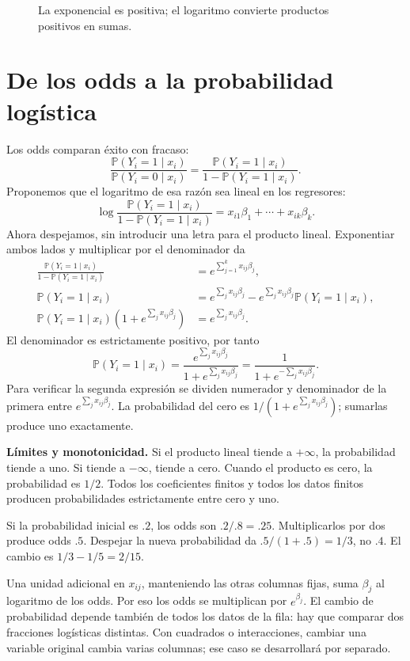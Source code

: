 \documentclass[11pt,a4paper]{article}
\newcommand{\Prob}{\mathbb P}
\begin{document}
\begin{figure}[H]\centering
{}
\caption{La exponencial es positiva; el logaritmo convierte productos positivos en sumas.}
\end{figure}

\clearpage
\section{De los odds a la probabilidad logística}\label{logit4}
Los odds comparan éxito con fracaso:
\[
\frac{\Prob(Y_i=1\mid x_i)}{\Prob(Y_i=0\mid x_i)}
=\frac{\Prob(Y_i=1\mid x_i)}{1-\Prob(Y_i=1\mid x_i)}.
\]
Proponemos que el logaritmo de esa razón sea lineal en los regresores:
\[
\log\frac{\Prob(Y_i=1\mid x_i)}{1-\Prob(Y_i=1\mid x_i)}
=x_{i1}\beta_1+\cdots+x_{ik}\beta_k.
\]
Ahora despejamos, sin introducir una letra para el producto lineal.
Exponentiar ambos lados y multiplicar por el denominador da
\[
\begin{aligned}
\frac{\Prob(Y_i=1\mid x_i)}{1-\Prob(Y_i=1\mid x_i)}
&=e^{\sum_{j=1}^kx_{ij}\beta_j},\\
\Prob(Y_i=1\mid x_i)
&=e^{\sum_jx_{ij}\beta_j}
-e^{\sum_jx_{ij}\beta_j}\Prob(Y_i=1\mid x_i),\\
\Prob(Y_i=1\mid x_i)(1+e^{\sum_jx_{ij}\beta_j})
&=e^{\sum_jx_{ij}\beta_j}.
\end{aligned}
\]
El denominador es estrictamente positivo, por tanto
\[
\boxed{\Prob(Y_i=1\mid x_i)=
\frac{e^{\sum_jx_{ij}\beta_j}}{1+e^{\sum_jx_{ij}\beta_j}}
=\frac1{1+e^{-\sum_jx_{ij}\beta_j}}}.
\]
Para verificar la segunda expresión se dividen numerador y denominador
de la primera entre $e^{\sum_jx_{ij}\beta_j}$.
La probabilidad del cero es $1/(1+e^{\sum_jx_{ij}\beta_j})$;
sumarlas produce uno exactamente.

\textbf{Límites y monotonicidad.}
Si el producto lineal tiende a $+\infty$, la probabilidad tiende a uno.
Si tiende a $-\infty$, tiende a cero.
Cuando el producto es cero, la probabilidad es $1/2$.
Todos los coeficientes finitos y todos los datos finitos producen
probabilidades estrictamente entre cero y uno.

\begin{ejemplo}
Si la probabilidad inicial es $.2$, los odds son $.2/.8=.25$.
Multiplicarlos por dos produce odds $.5$.
Despejar la nueva probabilidad da $.5/(1+.5)=1/3$,
no $.4$. El cambio es $1/3-1/5=2/15$.
\end{ejemplo}
Una unidad adicional en $x_{ij}$, manteniendo las otras columnas fijas,
suma $\beta_j$ al logaritmo de los odds.
Por eso los odds se multiplican por $e^{\beta_j}$.
El cambio de probabilidad depende también de todos los datos de la fila:
hay que comparar dos fracciones logísticas distintas.
Con cuadrados o interacciones, cambiar una variable original cambia
varias columnas; ese caso se desarrollará por separado.
\end{document}
